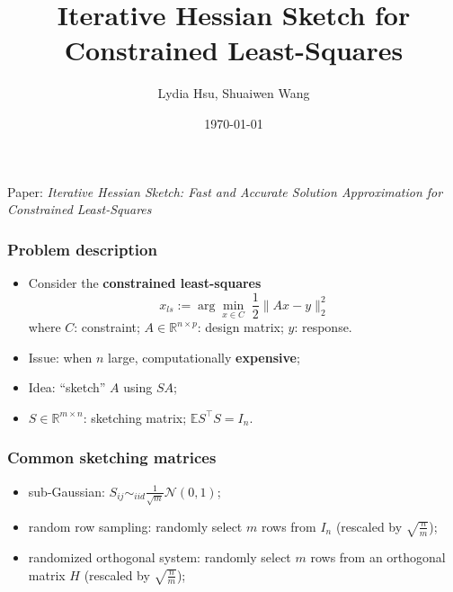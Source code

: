 \documentclass{beamer}
\title[Iterative Hessian Sketch]{Iterative Hessian Sketch for Constrained Least-Squares}
\author{Lydia Hsu, Shuaiwen Wang}
\date{\today} %
\begin{document}
\begin{frame}
    \titlepage
    
    \tiny Paper: \textit{Iterative Hessian Sketch: Fast and Accurate Solution Approximation
    for Constrained Least-Squares}
\end{frame}

\begin{frame}
    \frametitle{Problem description}

    \begin{itemize}
        \item<1-> Consider the \textbf{constrained least-squares}
            \begin{equation*}
                x_{ls} := \arg\min_{x \in C} \; \frac{1}{2} \|Ax-y\|^2_2
            \end{equation*}
            where \quad $C$: constraint; \quad $A \in \mathbb{R}^{n \times p}$: design matrix; \quad $y$: response.
        
        \item<2-> Issue: when $n$ large, computationally \textbf{expensive};
        \item<3-> Idea: ``sketch'' $A$ using $SA$;
        \item<4-> $S \in \mathbb{R}^{m \times n}$: sketching matrix; \quad
            $\mathbb{E} S^\top S = I_n$.
    \end{itemize}
\end{frame}

\begin{frame}
    \frametitle{Common sketching matrices}

    \begin{itemize}
        \item<1-> sub-Gaussian: $S_{ij} \sim_{iid} \frac{1}{\sqrt{m}}
            \mathcal{N}(0, 1)$; 
        \item<2-> random row sampling: randomly select $m$ rows from $I_n$
            (rescaled by $\sqrt{\frac{n}{m}}$);
        \item<3-> randomized orthogonal system: randomly select $m$ rows from
            an orthogonal matrix $H$ (rescaled by $\sqrt{\frac{n}{m}}$);
    \end{itemize}
\end{frame}
\end{document}
